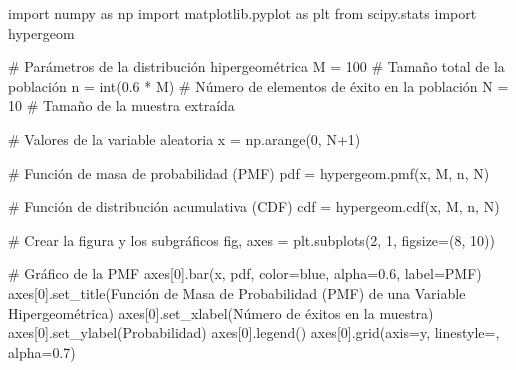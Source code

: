 \documentclass[
  letterpaper,
  DIV=11,
  numbers=noendperiod]{scrreprt}
\newenvironment{Shaded}{\begin{snugshade}}{\end{snugshade}}
\newcommand{\BuiltInTok}[1]{\textcolor[rgb]{0.00,0.23,0.31}{#1}}
\newcommand{\CommentTok}[1]{\textcolor[rgb]{0.37,0.37,0.37}{#1}}
\newcommand{\DecValTok}[1]{\textcolor[rgb]{0.68,0.00,0.00}{#1}}
\newcommand{\FloatTok}[1]{\textcolor[rgb]{0.68,0.00,0.00}{#1}}
\newcommand{\ImportTok}[1]{\textcolor[rgb]{0.00,0.46,0.62}{#1}}
\newcommand{\NormalTok}[1]{\textcolor[rgb]{0.00,0.23,0.31}{#1}}
\newcommand{\OperatorTok}[1]{\textcolor[rgb]{0.37,0.37,0.37}{#1}}
\newcommand{\StringTok}[1]{\textcolor[rgb]{0.13,0.47,0.30}{#1}}
\begin{document}
\begin{Shaded}
\begin{Highlighting}[]
\ImportTok{import}\NormalTok{ numpy }\ImportTok{as}\NormalTok{ np}
\ImportTok{import}\NormalTok{ matplotlib.pyplot }\ImportTok{as}\NormalTok{ plt}
\ImportTok{from}\NormalTok{ scipy.stats }\ImportTok{import}\NormalTok{ hypergeom}

\CommentTok{\# Parámetros de la distribución hipergeométrica}
\NormalTok{M }\OperatorTok{=} \DecValTok{100}  \CommentTok{\# Tamaño total de la población}
\NormalTok{n }\OperatorTok{=} \BuiltInTok{int}\NormalTok{(}\FloatTok{0.6} \OperatorTok{*}\NormalTok{ M)  }\CommentTok{\# Número de elementos de éxito en la población}
\NormalTok{N }\OperatorTok{=} \DecValTok{10}  \CommentTok{\# Tamaño de la muestra extraída}

\CommentTok{\# Valores de la variable aleatoria}
\NormalTok{x }\OperatorTok{=}\NormalTok{ np.arange(}\DecValTok{0}\NormalTok{, N}\OperatorTok{+}\DecValTok{1}\NormalTok{)}

\CommentTok{\# Función de masa de probabilidad (PMF)}
\NormalTok{pdf }\OperatorTok{=}\NormalTok{ hypergeom.pmf(x, M, n, N)}

\CommentTok{\# Función de distribución acumulativa (CDF)}
\NormalTok{cdf }\OperatorTok{=}\NormalTok{ hypergeom.cdf(x, M, n, N)}

\CommentTok{\# Crear la figura y los subgráficos}
\NormalTok{fig, axes }\OperatorTok{=}\NormalTok{ plt.subplots(}\DecValTok{2}\NormalTok{, }\DecValTok{1}\NormalTok{, figsize}\OperatorTok{=}\NormalTok{(}\DecValTok{8}\NormalTok{, }\DecValTok{10}\NormalTok{))}

\CommentTok{\# Gráfico de la PMF}
\NormalTok{axes[}\DecValTok{0}\NormalTok{].bar(x, pdf, color}\OperatorTok{=}\StringTok{\textquotesingle{}blue\textquotesingle{}}\NormalTok{, alpha}\OperatorTok{=}\FloatTok{0.6}\NormalTok{, label}\OperatorTok{=}\StringTok{\textquotesingle{}PMF\textquotesingle{}}\NormalTok{)}
\NormalTok{axes[}\DecValTok{0}\NormalTok{].set\_title(}\StringTok{\textquotesingle{}Función de Masa de Probabilidad (PMF) de una Variable Hipergeométrica\textquotesingle{}}\NormalTok{)}
\NormalTok{axes[}\DecValTok{0}\NormalTok{].set\_xlabel(}\StringTok{\textquotesingle{}Número de éxitos en la muestra\textquotesingle{}}\NormalTok{)}
\NormalTok{axes[}\DecValTok{0}\NormalTok{].set\_ylabel(}\StringTok{\textquotesingle{}Probabilidad\textquotesingle{}}\NormalTok{)}
\NormalTok{axes[}\DecValTok{0}\NormalTok{].legend()}
\NormalTok{axes[}\DecValTok{0}\NormalTok{].grid(axis}\OperatorTok{=}\StringTok{\textquotesingle{}y\textquotesingle{}}\NormalTok{, linestyle}\OperatorTok{=}\StringTok{\textquotesingle{}{-}{-}\textquotesingle{}}\NormalTok{, alpha}\OperatorTok{=}\FloatTok{0.7}\NormalTok{)}


\end{Highlighting}
\end{Shaded}
\end{document}
